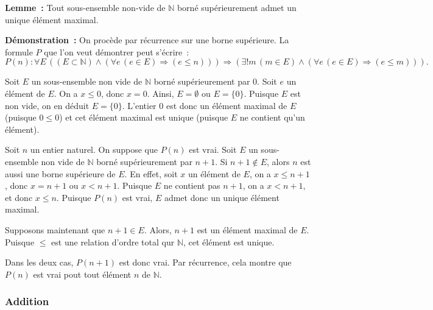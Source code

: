 \bigskip

\noindent\textbf{Lemme :} Tout sous-ensemble non-vide de $\mathbb{N}$ borné supérieurement admet un unique élément maximal.

\medskip

\noindent\textbf{Démonstration :} 
    On procède par récurrence sur une borne supérieure. 
    La formule $P$ que l'on veut démontrer peut s'écrire : 
    \begin{equation}
        P(n): 
        \forall E \, 
        ((E \subset \mathbb{N}) 
            \wedge (\forall e \, (e \in E) \Rightarrow (e \leq n)))
        \Rightarrow
        (\exists ! m \, (m \in E) \wedge 
            (\forall e \, (e \in E) \Rightarrow (e \leq m))).
    \end{equation}

    Soit $E$ un sous-ensemble non vide de $\mathbb{N}$ borné supérieurement par $0$.
    Soit $e$ un élément de $E$. 
    On a $x \leq 0$, donc $x = 0$. 
    Ainsi, $E = \emptyset$ ou $E = \lbrace 0 \rbrace$.
    Puisque $E$ est non vide, on en déduit $E = \lbrace 0 \rbrace$. 
    L'entier $0$ est donc un élément maximal de $E$ (puisque $0 \leq 0$) et cet élément maximal est unique (puisque $E$ ne contient qu'un élément).

    Soit $n$ un entier naturel. 
    On suppose que $P(n)$ est vrai.
    Soit $E$ un sous-ensemble non vide de $\mathbb{N}$ borné supérieurement par $n+1$. 
    Si $n+1 \notin E$, alors $n$ est aussi une borne supérieure de $E$. 
    En effet, soit $x$ un élément de $E$, on a $x \leq n+1$, donc $x = n+1$ ou $x < n + 1$. 
    Puisque $E$ ne contient pas $n+1$, on a $x < n+1$, et donc $x \leq n$. 
    Puisque $P(n)$ est vrai, $E$ admet donc un unique élément maximal.

    Supposons maintenant que $n+1 \in E$. 
    Alors, $n+1$ est un élément maximal de $E$. 
    Puisque $\leq$ est une relation d'ordre total qur $\mathbb{N}$, cet élément est unique. 

    Dans les deux cas, $P(n+1)$ est donc vrai. 
    Par récurrence, cela montre que $P(n)$ est vrai pout tout élément $n$ de $\mathbb{N}$.

   \done 

\subsubsection{Addition}
\label{subsub:addition}

